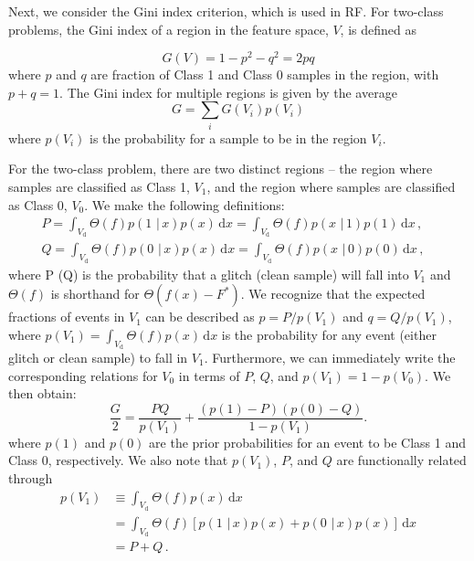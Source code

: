 \documentclass[prd, twocolumn, lengthcheck, superscriptaddress, showpacs, letterpaper, nofootinbib]{revtex4-1}
\newcommand\given{\,\,|\,}
\newcommand\auxvec{x}
\newcommand\Vdata{V_\mathrm{d}}
\newcommand\Ft{\ensuremath{F^\ast}}
\newcommand\pVg{\ensuremath{p(V_1)}}
\newcommand\pVc{\ensuremath{p(V_0)}}
\newcommand\diff{\, \mathrm{d}}
\begin{document}
Next, we consider the Gini index criterion, which is used in \ac{RF}. For two-class problems, the Gini index of a region in the feature space, $V$, is defined as 

\begin{equation}
\label{Ginidef}
G(V) = 1 - p^2 -q^2 = 2pq 
\end{equation}
where $p$ and $q$ are fraction of Class 1 and Class 0 samples in the region, with $p+q=1$. The Gini index for multiple regions is given by the average
\begin{equation}
\label{Giniaverage}
G = \sum_{i} G(V_i)p(V_i)
\end{equation}
where $p(V_i)$ is the probability for a sample to be in the region $V_i$. 

For the two-class problem, there are two distinct regions -- the region where samples are classified as Class 1, $V_1$, and the region where samples are classified as Class 0, $V_0$. We make the following definitions:
\begin{subequations}
\label{PQdefinitions}
\begin{align}
P = \int_{\Vdata}\! \Theta(f)p(1\given\auxvec)p(\auxvec) \diff \auxvec = \int_{\Vdata}\! \Theta(f)p(\auxvec\given1)p(1)\diff\auxvec \,,&\\
Q = \int_{\Vdata}\! \Theta(f)p(0\given\auxvec)p(\auxvec) \diff \auxvec = \int_{\Vdata}\! \Theta(f)p(\auxvec\given0)p(0)\diff\auxvec \,,
 \end{align}
\end{subequations}
where P (Q) is the probability that a glitch (clean sample) will fall into $V_1$ and $\Theta(f)$ is shorthand for $\Theta\left(f(\auxvec) - \Ft\right)$. We recognize that the expected fractions of events in $V_1$ can be described as $p=P/\pVg$ and $q=Q/\pVg$, where $\pVg=\int_{\Vdata}\! \Theta(f)p(\auxvec)\diff\auxvec$ is the probability for any event (either glitch or clean sample) to fall in $V_1$. Furthermore, we can immediately write the corresponding relations for $V_0$ in terms of $P$, $Q$, and $\pVg=1-\pVc$. We then obtain:
\begin{equation}
\label{Gfinal}
\frac{G}{2} = \frac{PQ}{\pVg} + \frac{\left(p(1) - P\right)\left(p(0) - Q\right)}{1-\pVg}.
\end{equation}
where $p(1)$ and $p(0)$ are the prior probabilities for an event to be Class 1 and Class 0, respectively. We also note that $\pVg$, $P$, and $Q$ are functionally related through
\begin{subequations}
\label{norm}
\begin{align}
\pVg & \equiv \int_{\Vdata}\! \Theta(f)p(\auxvec) \diff \auxvec \nonumber \\
       & =  \int_{\Vdata}\! \Theta(f)\left[ p(1\given\auxvec)p(\auxvec) + p(0\given\auxvec)p(\auxvec)\right]\diff\auxvec  \nonumber \\ 
       & = P + Q\,.
\end{align}
\end{subequations}
\end{document}
